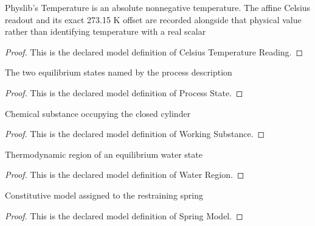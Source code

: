\begin{definition}
  \label{def:physics:phyx-mini-0452:phyxminiproblems-problemphyxmini0452-celsiustemperaturereading}
  Physlib's Temperature is an absolute nonnegative temperature. The affine Celsius readout and its exact 273.15 K offset are recorded alongside that physical value rather than identifying temperature with a real scalar
\end{definition}
\begin{proof}
  This is the declared model definition of Celsius Temperature Reading.
\end{proof}
\begin{definition}
  \label{def:physics:phyx-mini-0452:phyxminiproblems-problemphyxmini0452-processstate}
  The two equilibrium states named by the process description
\end{definition}
\begin{proof}
  This is the declared model definition of Process State.
\end{proof}
\begin{definition}
  \label{def:physics:phyx-mini-0452:phyxminiproblems-problemphyxmini0452-workingsubstance}
  Chemical substance occupying the closed cylinder
\end{definition}
\begin{proof}
  This is the declared model definition of Working Substance.
\end{proof}
\begin{definition}
  \label{def:physics:phyx-mini-0452:phyxminiproblems-problemphyxmini0452-waterregion}
  Thermodynamic region of an equilibrium water state
\end{definition}
\begin{proof}
  This is the declared model definition of Water Region.
\end{proof}
\begin{definition}
  \label{def:physics:phyx-mini-0452:phyxminiproblems-problemphyxmini0452-springmodel}
  Constitutive model assigned to the restraining spring
\end{definition}
\begin{proof}
  This is the declared model definition of Spring Model.
\end{proof}
